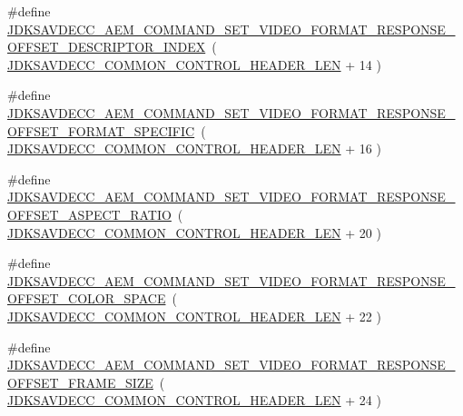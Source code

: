 \begin{DoxyCompactItemize}
\item 
\#define \hyperlink{group__command__set__video__format__response_ga21247c9c7adf8ea8d7efc1c7981e6f96}{J\+D\+K\+S\+A\+V\+D\+E\+C\+C\+\_\+\+A\+E\+M\+\_\+\+C\+O\+M\+M\+A\+N\+D\+\_\+\+S\+E\+T\+\_\+\+V\+I\+D\+E\+O\+\_\+\+F\+O\+R\+M\+A\+T\+\_\+\+R\+E\+S\+P\+O\+N\+S\+E\+\_\+\+O\+F\+F\+S\+E\+T\+\_\+\+D\+E\+S\+C\+R\+I\+P\+T\+O\+R\+\_\+\+I\+N\+D\+EX}~( \hyperlink{group__jdksavdecc__avtp__common__control__header_gaae84052886fb1bb42f3bc5f85b741dff}{J\+D\+K\+S\+A\+V\+D\+E\+C\+C\+\_\+\+C\+O\+M\+M\+O\+N\+\_\+\+C\+O\+N\+T\+R\+O\+L\+\_\+\+H\+E\+A\+D\+E\+R\+\_\+\+L\+EN} + 14 )
\item 
\#define \hyperlink{group__command__set__video__format__response_ga031779470a12a5fe73e0b4aaa724ab5d}{J\+D\+K\+S\+A\+V\+D\+E\+C\+C\+\_\+\+A\+E\+M\+\_\+\+C\+O\+M\+M\+A\+N\+D\+\_\+\+S\+E\+T\+\_\+\+V\+I\+D\+E\+O\+\_\+\+F\+O\+R\+M\+A\+T\+\_\+\+R\+E\+S\+P\+O\+N\+S\+E\+\_\+\+O\+F\+F\+S\+E\+T\+\_\+\+F\+O\+R\+M\+A\+T\+\_\+\+S\+P\+E\+C\+I\+F\+IC}~( \hyperlink{group__jdksavdecc__avtp__common__control__header_gaae84052886fb1bb42f3bc5f85b741dff}{J\+D\+K\+S\+A\+V\+D\+E\+C\+C\+\_\+\+C\+O\+M\+M\+O\+N\+\_\+\+C\+O\+N\+T\+R\+O\+L\+\_\+\+H\+E\+A\+D\+E\+R\+\_\+\+L\+EN} + 16 )
\item 
\#define \hyperlink{group__command__set__video__format__response_ga9eeac2880ba296cfe543b79e60db5d65}{J\+D\+K\+S\+A\+V\+D\+E\+C\+C\+\_\+\+A\+E\+M\+\_\+\+C\+O\+M\+M\+A\+N\+D\+\_\+\+S\+E\+T\+\_\+\+V\+I\+D\+E\+O\+\_\+\+F\+O\+R\+M\+A\+T\+\_\+\+R\+E\+S\+P\+O\+N\+S\+E\+\_\+\+O\+F\+F\+S\+E\+T\+\_\+\+A\+S\+P\+E\+C\+T\+\_\+\+R\+A\+T\+IO}~( \hyperlink{group__jdksavdecc__avtp__common__control__header_gaae84052886fb1bb42f3bc5f85b741dff}{J\+D\+K\+S\+A\+V\+D\+E\+C\+C\+\_\+\+C\+O\+M\+M\+O\+N\+\_\+\+C\+O\+N\+T\+R\+O\+L\+\_\+\+H\+E\+A\+D\+E\+R\+\_\+\+L\+EN} + 20 )
\item 
\#define \hyperlink{group__command__set__video__format__response_ga35f252d5b6faa3a490368619c05704c6}{J\+D\+K\+S\+A\+V\+D\+E\+C\+C\+\_\+\+A\+E\+M\+\_\+\+C\+O\+M\+M\+A\+N\+D\+\_\+\+S\+E\+T\+\_\+\+V\+I\+D\+E\+O\+\_\+\+F\+O\+R\+M\+A\+T\+\_\+\+R\+E\+S\+P\+O\+N\+S\+E\+\_\+\+O\+F\+F\+S\+E\+T\+\_\+\+C\+O\+L\+O\+R\+\_\+\+S\+P\+A\+CE}~( \hyperlink{group__jdksavdecc__avtp__common__control__header_gaae84052886fb1bb42f3bc5f85b741dff}{J\+D\+K\+S\+A\+V\+D\+E\+C\+C\+\_\+\+C\+O\+M\+M\+O\+N\+\_\+\+C\+O\+N\+T\+R\+O\+L\+\_\+\+H\+E\+A\+D\+E\+R\+\_\+\+L\+EN} + 22 )
\item 
\#define \hyperlink{group__command__set__video__format__response_ga3038ea2e3ce9f4f4e27f09f8dc298d48}{J\+D\+K\+S\+A\+V\+D\+E\+C\+C\+\_\+\+A\+E\+M\+\_\+\+C\+O\+M\+M\+A\+N\+D\+\_\+\+S\+E\+T\+\_\+\+V\+I\+D\+E\+O\+\_\+\+F\+O\+R\+M\+A\+T\+\_\+\+R\+E\+S\+P\+O\+N\+S\+E\+\_\+\+O\+F\+F\+S\+E\+T\+\_\+\+F\+R\+A\+M\+E\+\_\+\+S\+I\+ZE}~( \hyperlink{group__jdksavdecc__avtp__common__control__header_gaae84052886fb1bb42f3bc5f85b741dff}{J\+D\+K\+S\+A\+V\+D\+E\+C\+C\+\_\+\+C\+O\+M\+M\+O\+N\+\_\+\+C\+O\+N\+T\+R\+O\+L\+\_\+\+H\+E\+A\+D\+E\+R\+\_\+\+L\+EN} + 24 )

\end{DoxyCompactItemize}
